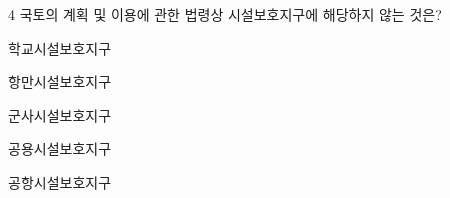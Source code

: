 \begin{question}{4}
국토의 계획 및 이용에 관한 법령상 시설보호지구에 해당하지 않는 것은?
\begin{choices}
  \item 학교시설보호지구
  \item 항만시설보호지구
  \item 군사시설보호지구
  \item 공용시설보호지구
  \item 공항시설보호지구
\end{choices}
\end{question}
